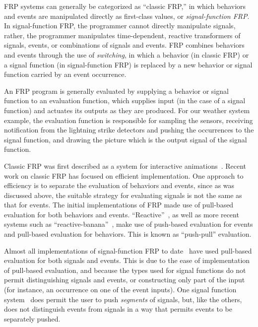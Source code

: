 
FRP systems can generally be categorized as ``classic FRP,'' in which behaviors
and events are manipulated directly as first-class values,
or {\em signal-function FRP}. In signal-function FRP, the programmer cannot
directly manipulate signals, rather, the programmer manipulates time-dependent,
reactive transformers of signals, events, or combinations of signals and events.
%
FRP combines behaviors and events through the use of {\em switching}, in which
a behavior (in classic FRP) or a signal function (in signal-function FRP) is
replaced by a new behavior or signal function carried by an event occurrence.

An FRP program is generally evaluated by supplying a behavior or signal function
to an evaluation function, which supplies input (in the case of a signal
function) and actuates its outputs as they are produced. For our weather system
example, the evaluation function is responsible for sampling the sensors,
receiving notification from the lightning strike detectors and pushing the
occurrences to the signal function, and drawing the picture which is the output
signal of the signal function.

Classic FRP was first described as a system for interactive animations~\cite{Elliott1997}.
Recent work on classic FRP has focused on efficient implementation. One approach
to efficiency is to separate the evaluation of behaviors and events, since
as was discussed above, the suitable strategy for evaluating signals is not the
same as that for events. The initial implementations of FRP made use of
pull-based evaluation for both behaviors and events.
``Reactive''~\cite{Elliott2009}, as well as more recent systems such as
``reactive-banana''~\cite{Apfelmus}, make use of push-based evaluation for
events and pull-based evaluation for behaviors. This is known as ``push-pull''
evaluation.

Almost all implementations of signal-function FRP to
date~\cite{Courtney2001-1,Nilsson2002,Nilsson2005,Sculthorpe2011} have used
pull-based evaluation for both signals and events. This is due to the ease of
implementation of pull-based evaluation, and because the types used for signal
functions do not permit distinguishing signals and events, or constructing only
part of the input (for instance, an occurrence on one of the event inputs). One
signal function system~\cite{Jeffrey2012} does permit the user to push
{\em segments} of signals, but, like the others, does not distinguish events
from signals in a way that permits events to be separately pushed.

